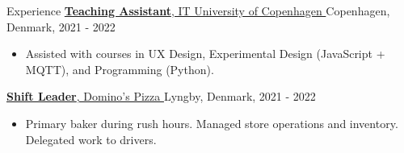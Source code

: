 \documentclass{resume}
\begin{document}
\begin{rSection}{Experience}
    \href{https://en.itu.dk}{
        \textbf{Teaching Assistant}, IT University of Copenhagen
    }
    \hfill
    Copenhagen, Denmark, 2021 - 2022
    \begin{itemize}
        \item Assisted with courses in UX Design, Experimental Design (JavaScript + MQTT), and Programming (Python).
    \end{itemize}

    \href{https://www.dominos.dk}{
        \textbf{Shift Leader}, Domino's Pizza
    }
    \hfill
    Lyngby, Denmark, 2021 - 2022
    \begin{itemize}
        \item Primary baker during rush hours. Managed store operations and inventory. Delegated work to drivers.
    \end{itemize}
\end{rSection}

\end{document}
